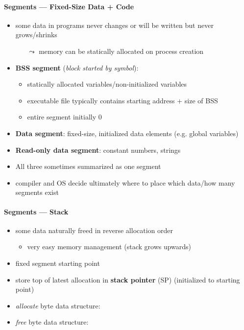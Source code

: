 \paragraph{Segments --- Fixed-Size Data + Code}
\begin{itemize}
	\item some data in programs never changes or will be written but never grows/shrinks
	\begin{itemize}
		\item[$ \leadsto $] memory can be statically allocated on process creation
	\end{itemize}
	\item \textbf{BSS segment} (\emph{block started by symbol}):
	\begin{itemize}
		\item statically allocated variables/non-initialized variables
		\item executable file typically contains starting address + size of BSS
		\item entire segment initially 0
	\end{itemize}
	\item \textbf{Data segment}: fixed-size, initialized data elements (e.g. global variables)
	\item \textbf{Read-only data segment}: constant numbers, strings
	\item All three sometimes summarized as one segment
	\item compiler and OS decide ultimately where to place which data/how many segments exist
\end{itemize}

\paragraph{Segments --- Stack}
\begin{itemize}
	\item some data naturally freed in reverse allocation order
	\begin{itemize}
		\item very easy memory management (stack grows upwards)
	\end{itemize}
	\item fixed segment starting point
	\item store top of latest allocation in \textbf{stack pointer} (SP) (initialized to starting point)
	\item \emph{allocate}  byte data structure: 
	\item \emph{free}  byte data structure: 
\end{itemize}

